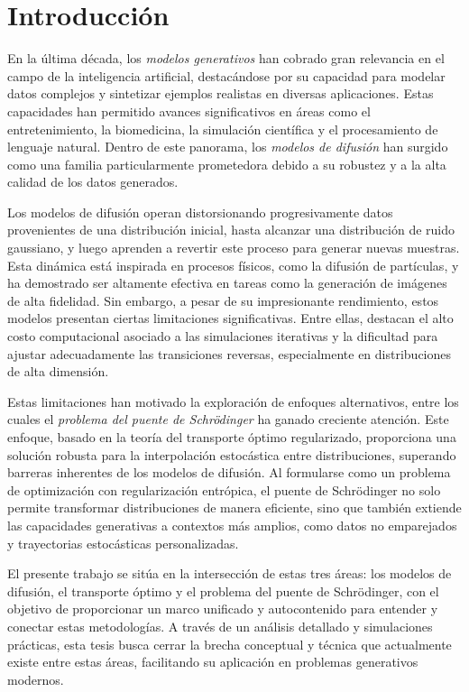 \chapter*{Introducción}

En la última década, los \textit{modelos generativos} han cobrado gran relevancia en el campo de la inteligencia artificial, destacándose por su capacidad para modelar datos complejos y sintetizar ejemplos realistas en diversas aplicaciones. Estas capacidades han permitido avances significativos en áreas como el entretenimiento, la biomedicina, la simulación científica y el procesamiento de lenguaje natural. Dentro de este panorama, los \textit{modelos de difusión} han surgido como una familia particularmente prometedora debido a su robustez y a la alta calidad de los datos generados.

Los modelos de difusión operan distorsionando progresivamente datos provenientes de una distribución inicial, hasta alcanzar una distribución de ruido gaussiano, y luego aprenden a revertir este proceso para generar nuevas muestras. Esta dinámica está inspirada en procesos físicos, como la difusión de partículas, y ha demostrado ser altamente efectiva en tareas como la generación de imágenes de alta fidelidad. Sin embargo, a pesar de su impresionante rendimiento, estos modelos presentan ciertas limitaciones significativas. Entre ellas, destacan el alto costo computacional asociado a las simulaciones iterativas y la dificultad para ajustar adecuadamente las transiciones reversas, especialmente en distribuciones de alta dimensión.

Estas limitaciones han motivado la exploración de enfoques alternativos, entre los cuales el \textit{problema del puente de Schrödinger} ha ganado creciente atención. Este enfoque, basado en la teoría del transporte óptimo regularizado, proporciona una solución robusta para la interpolación estocástica entre distribuciones, superando barreras inherentes de los modelos de difusión. Al formularse como un problema de optimización con regularización entrópica, el puente de Schrödinger no solo permite transformar distribuciones de manera eficiente, sino que también extiende las capacidades generativas a contextos más amplios, como datos no emparejados y trayectorias estocásticas personalizadas.

El presente trabajo se sitúa en la intersección de estas tres áreas: los modelos de difusión, el transporte óptimo y el problema del puente de Schrödinger, con el objetivo de proporcionar un marco unificado y autocontenido para entender y conectar estas metodologías. A través de un análisis detallado y simulaciones prácticas, esta tesis busca cerrar la brecha conceptual y técnica que actualmente existe entre estas áreas, facilitando su aplicación en problemas generativos modernos.


